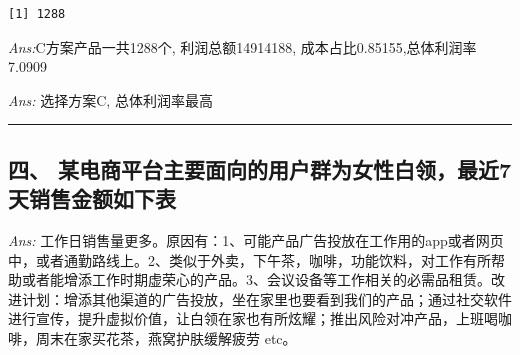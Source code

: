 \documentclass[
]{article}
\newenvironment{Shaded}{\begin{snugshade}}{\end{snugshade}}
\newcommand{\DecValTok}[1]{\textcolor[rgb]{0.00,0.00,0.81}{#1}}
\newcommand{\FunctionTok}[1]{\textcolor[rgb]{0.00,0.00,0.00}{#1}}
\newcommand{\NormalTok}[1]{#1}
\newcommand{\OtherTok}[1]{\textcolor[rgb]{0.56,0.35,0.01}{#1}}
\newcommand{\SpecialCharTok}[1]{\textcolor[rgb]{0.00,0.00,0.00}{#1}}
\begin{document}
\begin{verbatim}
[1] 1288
\end{verbatim}

\begin{Shaded}
\end{Shaded}

{\emph{Ans:}C方案产品一共1288个, 利润总额14914188,
成本占比0.85155,总体利润率7.0909}

{\emph{Ans:} 选择方案C, 总体利润率最高}

\begin{center}\rule{0.5\linewidth}{0.5pt}\end{center}

\hypertarget{ux56db-ux67d0ux7535ux5546ux5e73ux53f0ux4e3bux8981ux9762ux5411ux7684ux7528ux6237ux7fa4ux4e3aux5973ux6027ux767dux9886ux6700ux8fd17ux5929ux9500ux552eux91d1ux989dux5982ux4e0bux8868}{%
\subsection{四、
某电商平台主要面向的用户群为女性白领，最近7天销售金额如下表}\label{ux56db-ux67d0ux7535ux5546ux5e73ux53f0ux4e3bux8981ux9762ux5411ux7684ux7528ux6237ux7fa4ux4e3aux5973ux6027ux767dux9886ux6700ux8fd17ux5929ux9500ux552eux91d1ux989dux5982ux4e0bux8868}}

{\emph{Ans:}
工作日销售量更多。原因有：1、可能产品广告投放在工作用的app或者网页中，或者通勤路线上。2、类似于外卖，下午茶，咖啡，功能饮料，对工作有所帮助或者能增添工作时期虚荣心的产品。3、会议设备等工作相关的必需品租赁。改进计划：增添其他渠道的广告投放，坐在家里也要看到我们的产品；通过社交软件进行宣传，提升虚拟价值，让白领在家也有所炫耀；推出风险对冲产品，上班喝咖啡，周末在家买花茶，燕窝护肤缓解疲劳
etc。}
\end{document}
